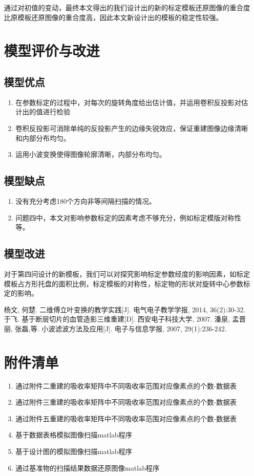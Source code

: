 \documentclass[withoutpreface,bwprint]{cumcmthesis} %
\begin{document}
\par 通过对初值的变动，最终本文得出的我们设计出的新的标定模板还原图像的重合度比原模板还原图像的重合度高，因此本文新设计出的模板的稳定性较强。

\section{模型评价与改进}
\subsection{模型优点}
\begin{enumerate}
	\item 在参数标定的过程中，对每次的旋转角度给出估计值，并运用卷积反投影对估计出的值进行检验
	\item 卷积反投影可消除单纯的反投影产生的边缘失锐效应，保证重建图像边缘清晰和内部分布均匀。
	\item 运用小波变换使得图像轮廓清晰，内部分布均匀。
\end{enumerate}
\subsection{模型缺点}
\begin{enumerate}
	\item 没有充分考虑180个方向非等间隔扫描的情况。
	\item 问题四中，本文对影响参数标定的因素考虑不够充分，例如标定模版对称性等。
\end{enumerate}

\subsection{模型改进}
对于第四问设计的新模板，我们可以对探究影响标定参数经度的影响因素，如标定模板占方形托盘的面积比例，标定模板的对称性，标定物的形状对旋转中心参数标定的影响。


\begin{thebibliography}{9}
  杨文, 何楚. 二维傅立叶变换的教学实践[J]. 电气电子教学学报, 2014, 36(2):30-32.
  于飞. 基于断层切片的血管造影三维重建[D]. 西安电子科技大学, 2007.
  潘泉, 孟晋丽, 张磊,等. 小波滤波方法及应用[J]. 电子与信息学报, 2007, 29(1):236-242.
\end{thebibliography}

\section{附件清单}
\begin{enumerate}
	\item 通过附件二重建的吸收率矩阵中不同吸收率范围对应像素点的个数-数据表
	\item 通过附件三重建的吸收率矩阵中不同吸收率范围对应像素点的个数-数据表
	\item 通过附件五重建的吸收率矩阵中不同吸收率范围对应像素点的个数-数据表
	\item 基于数据表格模拟图像扫描matlab程序
	\item 基于设计图的模拟图像扫描matlab程序
	\item 通过基准物的扫描结果数据还原图像matlab程序
\end{enumerate}
\newpage
\end{document}
